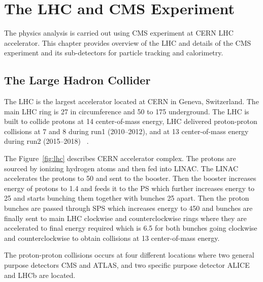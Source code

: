 \chapter{
  The LHC and CMS Experiment
 }\label{ch_cms}

The physics analysis is carried out using \gls{CMS} experiment at
\gls{CERN} \gls{LHC} accelerator. This chapter provides overview of the \gls{LHC}
and details of the CMS experiment and its sub-detectors for particle tracking
and calorimetry.

\section{
  The Large Hadron Collider
 }\label{ch_cms:lhc}

The \gls{LHC} is the largest accelerator located at
\gls{CERN} in Geneva, Switzerland.
The main \gls{LHC} ring is 27\km{} in circumference
and 50 to 175\m{} underground.
The \gls{LHC} is built to collide protons at 14\TeV{} center-of-mass energy,
LHC delivered proton-proton collisions at 7 and 8\TeV{}
during run1 (2010--2012), and at 13\TeV{} center-of-mass energy during
run2 (2015--2018)
~\cite{Evans:2008}.

The Figure~\ref{fig:lhc} describes \gls{CERN} accelerator complex.
The protons are sourced by ionizing hydrogen atoms
and then fed into \gls{LINAC}.
The \gls{LINAC} accelerates the protons to 50\MeV{} and sent to the booster.
Then the booster increases energy of protons to 1.4\GeV{} and
feeds it to the \gls{PS} which further increases energy to 25\GeV{}
and starts bunching them together with bunches 25\nanoseconds{} apart.
Then the proton bunches are passed through \gls{SPS} which increases energy
to 450\GeV{} and bunches are finally sent to main \gls{LHC} clockwise and counterclockwise
rings where they are accelerated to final energy required which is 6.5\TeV{}
for both bunches going clockwise and counterclockwise
to obtain collisions at 13\TeV{} center-of-mass energy.

The proton-proton collisions occurs at four different locations where two
general purpose detectors \gls{CMS} and \gls{ATLAS}, and
two specific purpose detector \gls{ALICE} and \gls{LHCb} are located.

